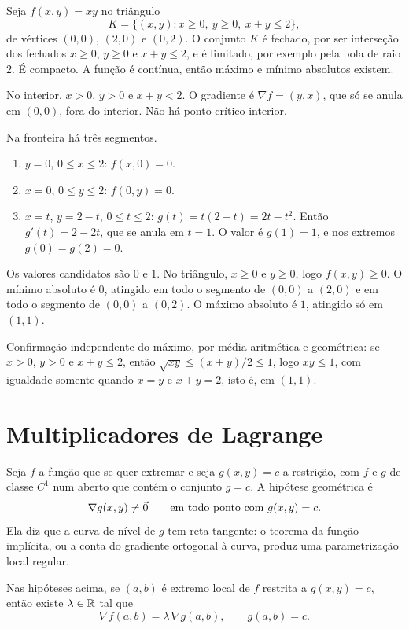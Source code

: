 \documentclass[11pt,a4paper]{article}
\begin{document}
\begin{exemplo}
Seja $f(x,y)=xy$ no triângulo
\[
K=\{(x,y):x\ge 0,\ y\ge 0,\ x+y\le 2\},
\]
de vértices $(0,0)$, $(2,0)$ e $(0,2)$. O conjunto $K$ é fechado, por ser interseção dos fechados $x\ge 0$, $y\ge 0$ e $x+y\le 2$, e é limitado, por exemplo pela bola de raio $2$. É compacto. A função é contínua, então máximo e mínimo absolutos existem.

No interior, $x>0$, $y>0$ e $x+y<2$. O gradiente é $\nabla f=(y,x)$, que só se anula em $(0,0)$, fora do interior. Não há ponto crítico interior.

Na fronteira há três segmentos.
\begin{enumerate}[leftmargin=1.4em]
\item $y=0$, $0\le x\le 2$: $f(x,0)=0$.
\item $x=0$, $0\le y\le 2$: $f(0,y)=0$.
\item $x=t$, $y=2-t$, $0\le t\le 2$: $g(t)=t(2-t)=2t-t^2$. Então $g'(t)=2-2t$, que se anula em $t=1$. O valor é $g(1)=1$, e nos extremos $g(0)=g(2)=0$.
\end{enumerate}
Os valores candidatos são $0$ e $1$. No triângulo, $x\ge 0$ e $y\ge 0$, logo $f(x,y)\ge 0$. O mínimo absoluto é $0$, atingido em todo o segmento de $(0,0)$ a $(2,0)$ e em todo o segmento de $(0,0)$ a $(0,2)$. O máximo absoluto é $1$, atingido só em $(1,1)$.

Confirmação independente do máximo, por média aritmética e geométrica: se $x>0$, $y>0$ e $x+y\le 2$, então $\sqrt{xy}\le(x+y)/2\le 1$, logo $xy\le 1$, com igualdade somente quando $x=y$ e $x+y=2$, isto é, em $(1,1)$.
\end{exemplo}

\section{Multiplicadores de Lagrange}

Seja $f$ a função que se quer extremar e seja $g(x,y)=c$ a restrição, com $f$ e $g$ de classe $C^1$ num aberto que contém o conjunto $g=c$. A hipótese geométrica é
\[
\nabla g(x,y)\neq\vec{0}\qquad\text{em todo ponto com }g(x,y)=c.
\]
Ela diz que a curva de nível de $g$ tem reta tangente: o teorema da função implícita, ou a conta do gradiente ortogonal à curva, produz uma parametrização local regular.

\begin{teorema}
Nas hipóteses acima, se $(a,b)$ é extremo local de $f$ restrita a $g(x,y)=c$, então existe $\lambda\in\mathbb{R}$ tal que
\begin{equation}
\nabla f(a,b)=\lambda\,\nabla g(a,b),\qquad g(a,b)=c.
\label{eq:lagrange}
\end{equation}
\end{teorema}
\end{document}
